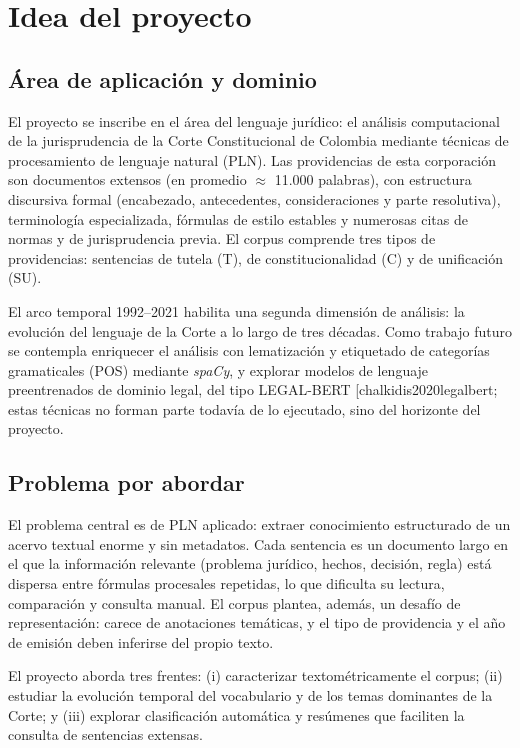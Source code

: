 \documentclass[11pt]{tg_usta}
\makeatletter
\renewcommand{\cite}{\@ifnextchar[{\@tempswatrue\@citex}{\@tempswafalse\@citex[]}}
\makeatother
\begin{document}
\section{Idea del proyecto}

\subsection{Área de aplicación y dominio}
El proyecto se inscribe en el área del lenguaje jurídico: el análisis computacional de la jurisprudencia de la Corte Constitucional de Colombia mediante técnicas de procesamiento de lenguaje natural (PLN). Las providencias de esta corporación son documentos extensos (en promedio $\approx$ 11.000 palabras), con estructura discursiva formal (encabezado, antecedentes, consideraciones y parte resolutiva), terminología especializada, fórmulas de estilo estables y numerosas citas de normas y de jurisprudencia previa. El corpus comprende tres tipos de providencias: sentencias de tutela (T), de constitucionalidad (C) y de unificación (SU).

El arco temporal 1992--2021 habilita una segunda dimensión de análisis: la evolución del lenguaje de la Corte a lo largo de tres décadas. Como trabajo futuro se contempla enriquecer el análisis con lematización y etiquetado de categorías gramaticales (POS) mediante \emph{spaCy}, y explorar modelos de lenguaje preentrenados de dominio legal, del tipo LEGAL-BERT \cite{chalkidis2020legalbert}; estas técnicas no forman parte todavía de lo ejecutado, sino del horizonte del proyecto.

\subsection{Problema por abordar}
El problema central es de PLN aplicado: extraer conocimiento estructurado de un acervo textual enorme y sin metadatos. Cada sentencia es un documento largo en el que la información relevante (problema jurídico, hechos, decisión, regla) está dispersa entre fórmulas procesales repetidas, lo que dificulta su lectura, comparación y consulta manual. El corpus plantea, además, un desafío de representación: carece de anotaciones temáticas, y el tipo de providencia y el año de emisión deben inferirse del propio texto.

El proyecto aborda tres frentes: (i) caracterizar textométricamente el corpus; (ii) estudiar la evolución temporal del vocabulario y de los temas dominantes de la Corte; y (iii) explorar clasificación automática y resúmenes que faciliten la consulta de sentencias extensas.
\end{document}

